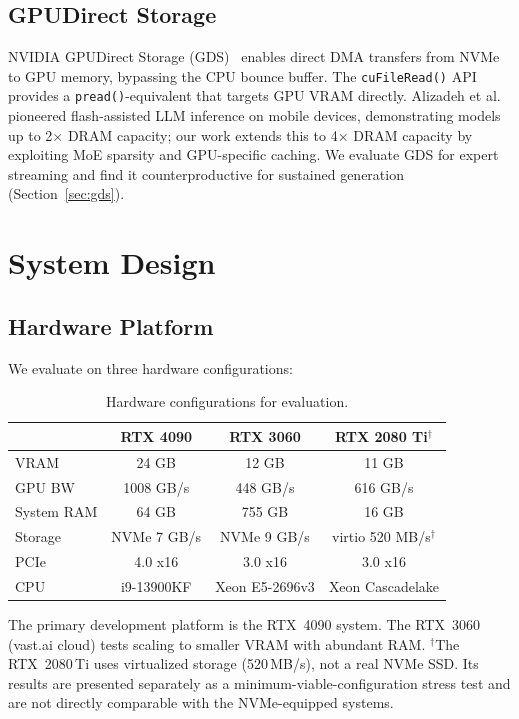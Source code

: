 \documentclass[11pt]{article}
\begin{document}
\subsection{GPUDirect Storage}

NVIDIA GPUDirect Storage (GDS)~\cite{gds} enables direct DMA transfers from NVMe to GPU memory, bypassing the CPU bounce buffer. The \texttt{cuFileRead()} API provides a \texttt{pread()}-equivalent that targets GPU VRAM directly. Alizadeh et al.~\cite{llminflash} pioneered flash-assisted LLM inference on mobile devices, demonstrating models up to 2$\times$ DRAM capacity; our work extends this to 4$\times$ DRAM capacity by exploiting MoE sparsity and GPU-specific caching. We evaluate GDS for expert streaming and find it counterproductive for sustained generation (Section~\ref{sec:gds}).

\section{System Design}

\subsection{Hardware Platform}

We evaluate on three hardware configurations:

\begin{table}[h]
\centering
\small
\caption{Hardware configurations for evaluation.}
\label{tab:hardware}
\begin{tabular}{lccc}
\toprule
& \textbf{RTX 4090} & \textbf{RTX 3060} & \textbf{RTX 2080 Ti}$^\dagger$ \\
\midrule
VRAM & 24 GB & 12 GB & 11 GB \\
GPU BW & 1008 GB/s & 448 GB/s & 616 GB/s \\
System RAM & 64 GB & 755 GB & 16 GB \\
Storage & NVMe 7 GB/s & NVMe 9 GB/s & virtio 520 MB/s$^\dagger$ \\
PCIe & 4.0 x16 & 3.0 x16 & 3.0 x16 \\
CPU & i9-13900KF & Xeon E5-2696v3 & Xeon Cascadelake \\
\bottomrule
\end{tabular}
\end{table}

The primary development platform is the RTX~4090 system. The RTX~3060 (vast.ai cloud) tests scaling to smaller VRAM with abundant RAM. $^\dagger$The RTX~2080\,Ti uses virtualized storage (520\,MB/s), not a real NVMe SSD. Its results are presented separately as a minimum-viable-configuration stress test and are not directly comparable with the NVMe-equipped systems.
\end{document}
